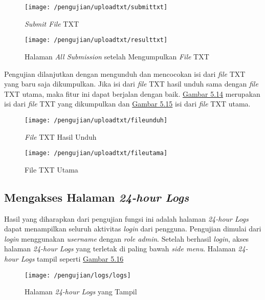 	\begin{figure}[H]
		\centering  
		\texttt{[image: /pengujian/uploadtxt/submittxt]}  
		\caption[\textit{Submit File} TXT]{\textit{Submit File} TXT} 
		\label{fig:submittxt} 
	\end{figure}

	\begin{figure}[H]
		\centering  
		\texttt{[image: /pengujian/uploadtxt/resulttxt]}  
		\caption[Halaman \textit{All Submission} setelah Mengumpulkan \textit{File} TXT]{Halaman \textit{All Submission} setelah Mengumpulkan \textit{File} TXT} 
		\label{fig:resultttxt} 
	\end{figure}

	Pengujian dilanjutkan dengan mengunduh dan mencocokan isi dari \textit{file} TXT yang baru saja dikumpulkan. Jika isi dari \textit{file} TXT hasil unduh sama dengan \textit{file} TXT utama, maka fitur ini dapat berjalan dengan baik. \hyperref[fig:resultttxt]{Gambar 5.14} merupakan isi dari \textit{file} TXT yang dikumpulkan dan \hyperref[fig:resultttxt]{Gambar 5.15} isi dari \textit{file} TXT utama.
	
	\begin{figure}[H]
		\centering  
		\texttt{[image: /pengujian/uploadtxt/fileunduh]}  
		\caption[\textit{File} TXT Hasil Unduh]{\textit{File} TXT Hasil Unduh} 
		\label{fig:fileunduh} 
	\end{figure}
	
	\begin{figure}[H]
		\centering  
		\texttt{[image: /pengujian/uploadtxt/fileutama]}  
		\caption[File TXT Utama]{File TXT Utama} 
		\label{fig:fileutama} 
	\end{figure}

	\subsection{Mengakses Halaman \textit{24-hour Logs}}
	Hasil yang diharapkan dari pengujian fungsi ini adalah halaman \textit{24-hour Logs} dapat menampilkan seluruh aktivitas \textit{login} dari pengguna. Pengujian dimulai dari \textit{login} menggunakan \textit{username} dengan \textit{role admin}. Setelah berhasil \textit{login}, akses halaman \textit{24-hour Logs} yang terletak di paling bawah \textit{side menu}. Halaman \textit{24-hour Logs} tampil seperti \hyperref[fig:logs]{Gambar 5.16}
	\begin{figure}[H]
		\centering  
		\texttt{[image: /pengujian/logs/logs]}  
		\caption[Halaman \textit{24-hour Logs} yang Tampil]{Halaman \textit{24-hour Logs} yang Tampil} 
		\label{fig:logs} 
	\end{figure}

